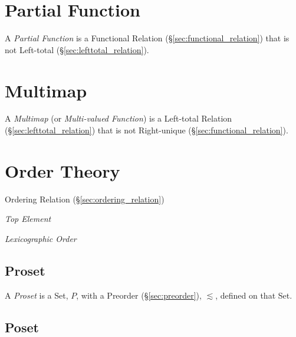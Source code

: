 \section{Partial Function}\label{sec:partial_function}

A \emph{Partial Function} is a Functional Relation
(\S\ref{sec:functional_relation}) that is not Left-total
(\S\ref{sec:lefttotal_relation}).



\section{Multimap}\label{sec:multimap}

A \emph{Multimap} (or \emph{Multi-valued Function}) is a Left-total
Relation (\S\ref{sec:lefttotal_relation}) that is not Right-unique
(\S\ref{sec:functional_relation}).



\section{Order Theory}\label{sec:order_theory}

Ordering Relation (\S\ref{sec:ordering_relation})

\emph{Top Element}

\emph{Lexicographic Order}



\subsection{Proset}\label{sec:proset}

A \emph{Proset} is a Set, $P$, with a Preorder
(\S\ref{sec:preorder}), $\lesssim$, defined on that Set.



\subsection{Poset}\label{sec:poset}

